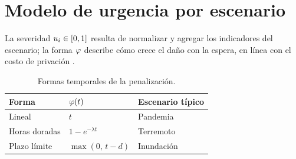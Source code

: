 \chapter{Modelo de urgencia por escenario}\label{cap:urgencia}

La severidad $u_{i} \in [0,1]$ resulta de normalizar y agregar los indicadores del
escenario; la forma $\varphi$ describe cómo crece el daño con la espera, en línea con el costo
de privación \parencite{holguinveras2013}.

\begin{table}[ht]
  \centering
  \caption{Formas temporales de la penalización.}\label{tab:formas}
  \begin{tabular}{@{}lll@{}}
    \toprule
    Forma & $\varphi(t)$ & Escenario típico \\
    \midrule
    Lineal & $t$ & Pandemia \\
    Horas doradas & $1 - e^{-\lambda t}$ & Terremoto \\
    Plazo límite & $\max(0,\, t - d)$ & Inundación \\
    \bottomrule
  \end{tabular}
\end{table}
